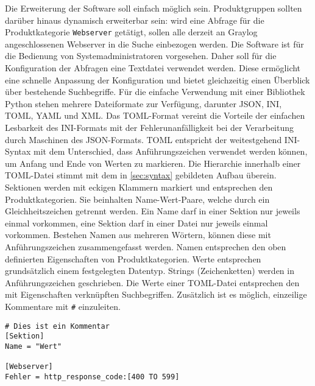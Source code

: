Die Erweiterung der Software soll einfach möglich sein. Produktgruppen sollten darüber hinaus dynamisch erweiterbar sein: wird eine Abfrage für die Produktkategorie \lstinline{Webserver} getätigt, sollen alle derzeit an Graylog angeschlossenen Webserver in die Suche einbezogen werden. Die Software ist für die Bedienung von Systemadministratoren vorgesehen. Daher soll für die Konfiguration der Abfragen eine Textdatei verwendet werden. Diese ermöglicht eine schnelle Anpassung der Konfiguration und bietet gleichzeitig einen Überblick über bestehende Suchbegriffe. Für die einfache Verwendung mit einer Bibliothek Python stehen mehrere Dateiformate zur Verfügung, darunter JSON, INI, TOML, YAML und XML. Das TOML-Format vereint die Vorteile der einfachen Lesbarkeit des INI-Formats mit der Fehlerunanfälligkeit bei der Verarbeitung durch Maschinen des JSON-Formats. TOML entspricht der weitestgehend INI-Syntax mit dem Unterschied, dass Anführungszeichen verwendet werden können, um Anfang und Ende von Werten zu markieren. Die Hierarchie innerhalb einer TOML-Datei stimmt mit dem in \autoref{sec:syntax} gebildeten Aufbau überein. Sektionen werden mit eckigen Klammern markiert und entsprechen den Produktkategorien. Sie beinhalten Name-Wert-Paare, welche durch ein Gleichheitszeichen getrennt werden. Ein Name darf in einer Sektion nur jeweils einmal vorkommen, eine Sektion darf in einer Datei nur jeweils einmal vorkommen. Bestehen Namen aus mehreren Wörtern, können diese mit Anführungszeichen zusammengefasst werden. Namen entsprechen den oben definierten Eigenschaften von Produktkategorien. Werte entsprechen grundsätzlich einem festgelegten Datentyp. Strings (Zeichenketten) werden in Anführungszeichen geschrieben. Die Werte einer TOML-Datei entsprechen den mit Eigenschaften verknüpften Suchbegriffen. Zusätzlich ist es möglich, einzeilige Kommentare mit \lstinline{#} einzuleiten.

\begin{lstlisting}[caption={Beispiel der TOML-Syntax.}, label=toml-syntax]
# Dies ist ein Kommentar
[Sektion]
Name = "Wert"

[Webserver]
Fehler = http_response_code:[400 TO 599] 
\end{lstlisting}
